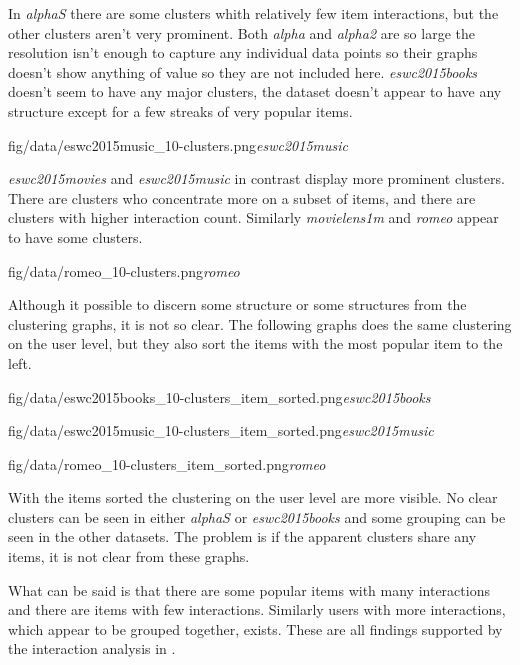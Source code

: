 \FloatBarrier

In \textit{alphaS} there are some clusters whith relatively few item interactions, but the other clusters aren't very prominent. Both \textit{alpha} and \textit{alpha2} are so large the resolution isn't enough to capture any individual data points so their graphs doesn't show anything of value so they are not included here.
\textit{eswc2015books} doesn't seem to have any major clusters, the dataset doesn't appear to have any structure except for a few streaks of very popular items.

{fig/data/eswc2015music_10-clusters.png}{\textit{eswc2015music}}

\textit{eswc2015movies} and \textit{eswc2015music} in contrast display more prominent clusters. There are clusters who concentrate more on a subset of items, and there are clusters with higher interaction count.  Similarly \textit{movielens1m} and \textit{romeo} appear to have some clusters.

{fig/data/romeo_10-clusters.png}{\textit{romeo}}

\FloatBarrier

Although it possible to discern some structure or some structures from the clustering graphs, it is not so clear. The following graphs does the same clustering on the user level, but they also sort the items with the most popular item to the left.

\FloatBarrier

{fig/data/eswc2015books_10-clusters_item_sorted.png}{\textit{eswc2015books}}

{fig/data/eswc2015music_10-clusters_item_sorted.png}{\textit{eswc2015music}}

{fig/data/romeo_10-clusters_item_sorted.png}{\textit{romeo}}

\FloatBarrier

With the items sorted the clustering on the user level are more visible. No clear clusters can be seen in either \textit{alphaS} or \textit{eswc2015books} and some grouping can be seen in the other datasets. The problem is if the apparent clusters share any items, it is not clear from these graphs.

What can be said is that there are some popular items with many interactions and there are items with few interactions. Similarly users with more interactions, which appear to be grouped together, exists. These are all findings supported by the interaction analysis in .

